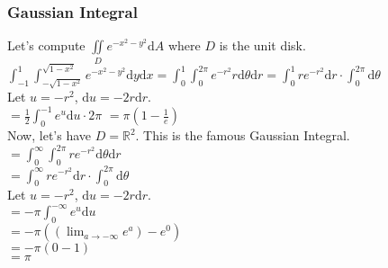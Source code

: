 \subsubsection{Gaussian Integral}
\noindent
Let's compute $\iint\limits_{D}{e^{-x^2-y^2}\mathrm{d}A}$ where $D$ is the unit disk.\\
\indent
$\int_{-1}^{1}{\int_{-\sqrt{1 - x^2}}^{\sqrt{1 - x^2}}{e^{-x^2 - y^2}\mathrm{d}y}\mathrm{d}x} = \int_{0}^{1}{\int_{0}^{2\pi}{e^{-r^2}r\mathrm{d}\theta}\mathrm{d}r} = \int_{0}^{1}{re^{-r^2}\mathrm{d}r} \cdot \int_{0}^{2\pi}{\mathrm{d}\theta}$\\
\indent
Let $u = -r^2$, $\mathrm{d} u =-2r\mathrm{d}r$.\\
\indent
$= \frac{1}{2}\int_{0}^{-1}{e^u\mathrm{d}u} \cdot 2\pi$
\indent
$ = \pi\left(1 - \frac{1}{e}\right)$\\
Now, let's have $D = \mathbb{R}^2$. This is the famous Gaussian Integral.\\
\indent
$= \int_{0}^{\infty}{\int_{0}^{2\pi}{re^{-r^2}\mathrm{d}\theta}\mathrm{d}r}$\\
\indent
$= \int_{0}^{\infty}{re^{-r^2}\mathrm{d}r} \cdot \int_{0}^{2\pi}{\mathrm{d}\theta}$\\
\indent
Let $ u =-r^2$, $\mathrm{d}u = -2r\mathrm{d}r$.\\
\indent
$= -\pi\int_{0}^{-\infty}{e^{u}\mathrm{d}u}$\\
\indent
$= -\pi\left(\left(\lim_{a\to -\infty}{e^{a}}\right) - e^0\right)$\\
\indent
$= -\pi\left(0 - 1\right)$\\
\indent
$= \pi$
